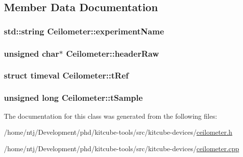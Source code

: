\subsection{Member Data Documentation}
\hypertarget{classCeilometer_adacde94d57006bd9d81a20919bcb4f20}{
\subsubsection[{experiment\-Name}]{\setlength{\rightskip}{0pt plus 5cm}std\-::string Ceilometer\-::experiment\-Name\hspace{0.3cm}{\ttfamily [private]}}}\label{classCeilometer_adacde94d57006bd9d81a20919bcb4f20}
\hypertarget{classCeilometer_ae6363cb7019753e8d2b1b005d030818e}{
\subsubsection[{header\-Raw}]{\setlength{\rightskip}{0pt plus 5cm}unsigned char$\ast$ Ceilometer\-::header\-Raw\hspace{0.3cm}{\ttfamily [private]}}}\label{classCeilometer_ae6363cb7019753e8d2b1b005d030818e}
\hypertarget{classCeilometer_a173231c1db65165d1a0cb91d3913339e}{
\subsubsection[{t\-Ref}]{\setlength{\rightskip}{0pt plus 5cm}struct timeval Ceilometer\-::t\-Ref\hspace{0.3cm}{\ttfamily [private]}}}\label{classCeilometer_a173231c1db65165d1a0cb91d3913339e}
\hypertarget{classCeilometer_ab98f876944333787e16570753c409560}{
\subsubsection[{t\-Sample}]{\setlength{\rightskip}{0pt plus 5cm}unsigned long Ceilometer\-::t\-Sample\hspace{0.3cm}{\ttfamily [private]}}}\label{classCeilometer_ab98f876944333787e16570753c409560}


The documentation for this class was generated from the following files\-:\begin{DoxyCompactItemize}
\item 
/home/ntj/\-Development/phd/kitcube-\/tools/src/kitcube-\/devices/\hyperlink{ceilometer_8h}{ceilometer.\-h}\item 
/home/ntj/\-Development/phd/kitcube-\/tools/src/kitcube-\/devices/\hyperlink{ceilometer_8cpp}{ceilometer.\-cpp}\end{DoxyCompactItemize}
